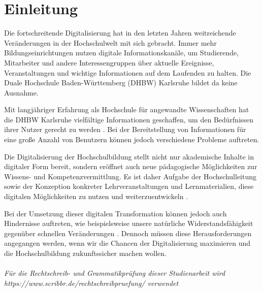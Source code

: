 \chapter{Einleitung}
Die fortschreitende Digitalisierung hat in den letzten Jahren weitreichende Veränderungen in der Hochschulwelt mit sich gebracht. Immer mehr Bildungseinrichtungen nutzen digitale Informationskanäle, um Studierende, Mitarbeiter und andere Interessengruppen über aktuelle Ereignisse, Veranstaltungen und wichtige Informationen auf dem Laufenden zu halten\cite{aachenerzeitung2022}. Die Duale Hochschule Baden-Württemberg (DHBW) Karlsruhe bildet da keine Ausnahme.

Mit langjähriger Erfahrung als Hochschule für angewandte Wissenschaften hat die DHBW Karlsruhe vielfältige Informationen geschaffen, um den Bedürfnissen ihrer Nutzer gerecht zu werden \cite{degruyter2021}. Bei der Bereitstellung von Informationen für eine große Anzahl von Benutzern können jedoch verschiedene Probleme auftreten.

Die Digitalisierung der Hochschulbildung stellt nicht nur akademische Inhalte in digitaler Form bereit, sondern eröffnet auch neue pädagogische Möglichkeiten zur Wissens- und Kompetenzvermittlung. \cite{hochschulforumdigitalisierung} Es ist daher Aufgabe der Hochschulleitung sowie der Konzeption konkreter Lehrveranstaltungen und Lernmaterialien, diese digitalen Möglichkeiten zu nutzen und weiterzuentwickeln \cite{springerlink2023}. 

Bei der Umsetzung dieser digitalen Transformation können jedoch auch Hindernisse auftreten, wie beispielsweise unsere natürliche Widerstandsfähigkeit gegenüber schnellen Veränderungen \cite{degruyter2021_2}. Dennoch müssen diese Herausforderungen angegangen werden, wenn wir die Chancen der Digitalisierung maximieren und die Hochschulbildung zukunftssicher machen wollen.
\\\\
\emph{Für die Rechtschreib- und Grammatikprüfung dieser Studienarbeit wird\\ https://www.scribbr.de/rechtschreibpruefung/ verwendet} 

